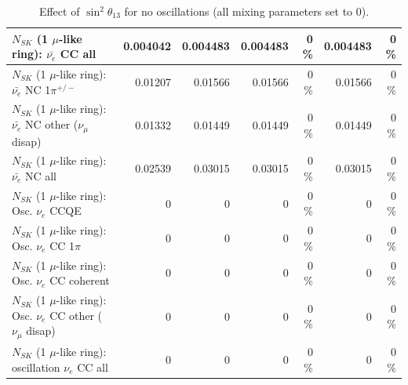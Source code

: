 \begin{table}
\begin{tabular}{| l | r | r | r  r | r  r |}
                            $N_{SK}$ (1 $\mu$-like ring): $\bar{\nu_{e}}$ CC all &        0.004042 &        0.004483 &        0.004483 &        0 \%  &        0.004483 &        0 \%  \\ 
\hline
                     $N_{SK}$ (1 $\mu$-like ring): $\bar{\nu_e}$ NC 1$\pi^{+/-}$ &         0.01207 &         0.01566 &         0.01566 &        0 \%  &         0.01566 &        0 \%  \\ 
          $N_{SK}$ (1 $\mu$-like ring): $\bar{\nu_e}$ NC other ($\nu_\mu$ disap) &         0.01332 &         0.01449 &         0.01449 &        0 \%  &         0.01449 &        0 \%  \\ 
                            $N_{SK}$ (1 $\mu$-like ring): $\bar{\nu_{e}}$ NC all &         0.02539 &         0.03015 &         0.03015 &        0 \%  &         0.03015 &        0 \%  \\ 
\hline
\hline
\hline
                                 $N_{SK}$ (1 $\mu$-like ring): Osc. $\nu_e$ CCQE &               0 &               0 &               0 &        0 \%  &               0 &        0 \%  \\ 
                            $N_{SK}$ (1 $\mu$-like ring): Osc. $\nu_e$ CC 1$\pi$ &               0 &               0 &               0 &        0 \%  &               0 &        0 \%  \\ 
                          $N_{SK}$ (1 $\mu$-like ring): Osc. $\nu_e$ CC coherent &               0 &               0 &               0 &        0 \%  &               0 &        0 \%  \\ 
           $N_{SK}$ (1 $\mu$-like ring): Osc. $\nu_e$ CC other ($\nu_\mu$ disap) &               0 &               0 &               0 &        0 \%  &               0 &        0 \%  \\ 
                        $N_{SK}$ (1 $\mu$-like ring): oscillation $\nu_e$ CC all &               0 &               0 &               0 &        0 \%  &               0 &        0 \%  \\ 
\hline
\hline
\end{tabular}
\caption{ Effect of $\sin^2\theta_{13}$ for no oscillations (all mixing parameters set to 0). }
\label{tab:num_mixing13_1RmuT_3f_osc_t13:0}
\end{table}
\clearpage
